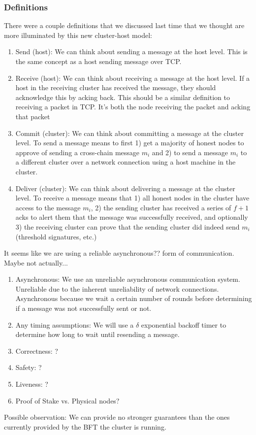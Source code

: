 \subsubsection{Definitions}
There were a couple definitions that we discussed last time that we thought are more illuminated by this new cluster-host model:
\begin{enumerate}
	\item Send (host): We can think about sending a message at the host level. This is the same concept as a host sending message over TCP. 
	\item Receive (host): We can think about receiving a message at the host level. If a host in the receiving cluster has received the message, they should acknowledge this by acking back. This should be a similar definition to receiving a packet in TCP. It's both the node receiving the packet and acking that packet
	\item Commit (cluster): We can think about committing a message at the cluster level. To send a message means to first 1) get a majority of honest nodes to approve of sending a cross-chain message $m_i$ and 2) to send a message $m_i$ to a different cluster over a network connection using a host machine in the cluster.
	\item Deliver (cluster): We can think about delivering a message at the cluster level. To receive a message means that 1) all honest nodes in the cluster have access to the message $m_i$, 2) the sending cluster has received a series of $f+1$ acks to alert them that the message was successfully received, and optionally 3) the receiving cluster can prove that the sending cluster did indeed send $m_i$ (threshold signatures, etc.)
\end{enumerate}
It seems like we are using a reliable asynchronous?? form of communication. Maybe not actually...
\begin{enumerate}
    \item Asynchronous: We use an unreliable asynchronous communication system. Unreliable due to the inherent unreliability of network connections. Asynchronous because we wait a certain number of rounds before determining if a message was not successfully sent or not.
    \item Any timing assumptions: We will use a $\delta$ exponential backoff timer to determine how long to wait until resending a message.
    \item Correctness: ?
    \item Safety: ?
    \item Liveness: ?  
	\item Proof of Stake vs. Physical nodes?
\end{enumerate}
Possible observation: We can provide no stronger guarantees than the ones currently provided by the BFT the cluster is running.

